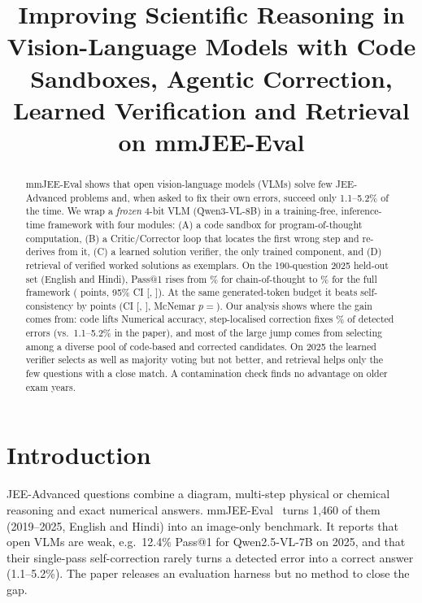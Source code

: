 \documentclass[conference]{IEEEtran}
\begin{document}
\title{Improving Scientific Reasoning in Vision-Language Models with Code Sandboxes, Agentic
Correction, Learned Verification and Retrieval on mmJEE-Eval}
\author{
}
\maketitle

\begin{abstract}
mmJEE-Eval shows that open vision-language models (VLMs) solve few JEE-Advanced problems and,
when asked to fix their own errors, succeed only 1.1--5.2\% of the time. We wrap a \emph{frozen}
4-bit VLM (Qwen3-VL-8B) in a training-free, inference-time framework with four modules: (A) a
code sandbox for program-of-thought computation, (B) a Critic/Corrector loop that locates the
first wrong step and re-derives from it, (C) a learned solution verifier, the only trained
component, and (D) retrieval of verified worked solutions as exemplars. On the 190-question 2025
held-out set (English and Hindi), Pass@1 rises from \BaseAcc\% for chain-of-thought to
\FullAcc\% for the full framework (\FullDelta{} points, 95\% CI [\FullLo, \FullHi]). At the same
generated-token budget it beats self-consistency by \FullVsSc{} points (CI [\FullVsScLo,
\FullVsScHi], McNemar $p{=}$\FullVsScP). Our analysis shows where the gain comes from: code
lifts Numerical accuracy, step-localised correction fixes \FixCross\% of detected errors (vs.\
1.1--5.2\% in the paper), and most of the large jump comes from selecting among a diverse pool of
code-based and corrected candidates. On 2025 the learned verifier selects as well as majority
voting but not better, and retrieval helps only the few questions with a close match. A
contamination check finds no advantage on older exam years.
\end{abstract}

\section{Introduction}
JEE-Advanced questions combine a diagram, multi-step physical or chemical reasoning and exact
numerical answers. mmJEE-Eval~\cite{mmjee} turns 1{,}460 of them (2019--2025, English and Hindi)
into an image-only benchmark. It reports that open VLMs are weak, e.g.\ 12.4\% Pass@1 for
Qwen2.5-VL-7B on 2025, and that their single-pass self-correction rarely turns a detected error
into a correct answer (1.1--5.2\%). The paper releases an evaluation harness but no method to
close the gap.
\end{document}
